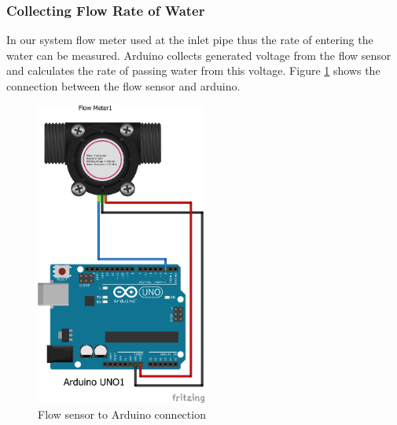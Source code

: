 \subsubsection*{Collecting Flow Rate of Water}
In our system flow meter used at the inlet pipe thus the rate of entering the water can be measured. Arduino collects generated voltage from the flow sensor and calculates the rate of passing water from this voltage.
Figure \ref{FlowSensor} shows the connection between the flow sensor and arduino.
\begin{figure}[H]
\centering
\includegraphics[width=0.5\textwidth]{figures/flow_bb.png}
\caption{Flow sensor to Arduino connection}
\label{FlowSensor}
\end{figure}

